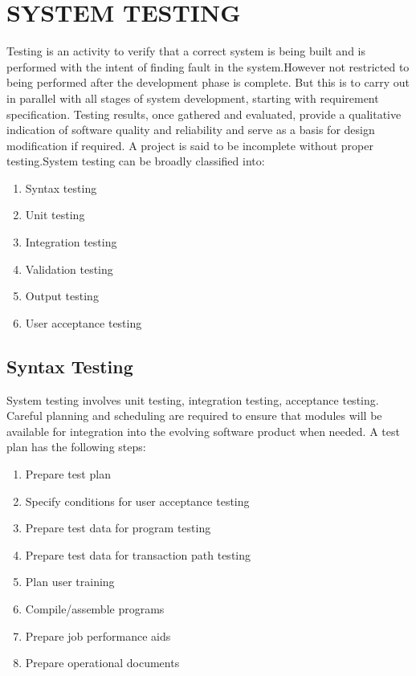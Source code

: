 \documentclass[a4paper,12pt]{article}
\begin{document}
\section{SYSTEM TESTING}\vspace{5mm}
Testing is an activity to verify that a correct system is being built and is performed with the intent of finding fault in the system.However not restricted to being performed after the development phase is complete. But this is to carry out in parallel with all stages of system development, starting with requirement specification. Testing results, once gathered and evaluated, provide a qualitative indication of software quality and reliability and serve as a basis for design modification if required. A project is said to be incomplete without proper testing.System testing can be broadly classified into:\par
\begin{enumerate}
\item Syntax testing
\item Unit testing
\item Integration testing
\item Validation testing
\item Output testing
\item User acceptance testing
\end{enumerate}
\subsection{Syntax Testing}\vspace{2mm}
System testing involves unit testing, integration testing, acceptance testing. Careful planning and scheduling are required to ensure that modules will be available for integration into the evolving software product when needed. A test plan has the following steps:
\begin{enumerate}
\item Prepare test plan
\item Specify conditions for user acceptance testing
\item Prepare test data for program testing
\item Prepare test data for transaction path testing
\item Plan user training
\item Compile/assemble programs
\item Prepare job performance aids
\item Prepare operational documents
\end{enumerate}
\end{document}
